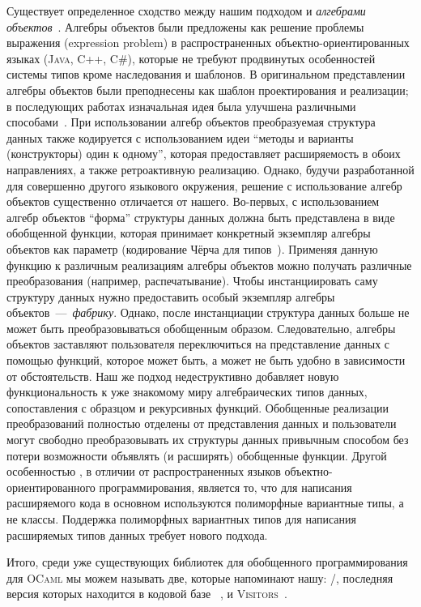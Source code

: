 Существует определенное сходство между нашим подходом и \emph{алгебрами объектов}~\cite{ObjectAlgebras}. Алгебры объектов были предложены как решение проблемы выражения (expression problem) в распространенных объектно-ориентированных языках  (\textsc{Java}, \textsc{C++}, \textsc{C\#}), которые не требуют продвинутых особенностей системы типов кроме наследования и шаблонов. В оригинальном представлении алгебры объектов были преподнесены как шаблон проектирования и реализации; в последующих работах изначальная идея была улучшена различными способами~\cite{ObjectAlgebrasAttribute,ObjectAlgebrasSYB}. При использовании алгебр объектов преобразуемая структура данных также кодируется с использованием идеи ``методы и варианты (конструкторы) один к одному'', которая предоставляет расширяемость в обоих направлениях, а также ретроактивную реализацию. Однако, будучи  разработанной для совершенно другого языкового окружения, решение с использование алгебр объектов существенно отличается от нашего. Во-первых, с использованием алгебр объектов ``форма'' структуры данных должна быть представлена в виде обобщенной функции, которая принимает конкретный экземпляр алгебры объектов как параметр (кодирование Чёрча для типов~\cite{Hinze}). Применяя данную функцию к различным реализациям алгебры объектов можно получать различные преобразования (например, распечатывание). Чтобы инстанциировать саму структуру данных нужно предоставить особый экземпляр алгебры объектов~---~\emph{фабрику}. Однако, после инстанциации структура данных больше не может быть преобразовываться обобщенным образом. Следовательно, алгебры объектов заставляют пользователя переключиться на представление данных с помощью функций, которое может быть, а может не быть удобно в зависимости от обстоятельств.  Наш же подход недеструктивно добавляет новую функциональность к уже знакомому миру алгебраических типов данных, сопоставления с образцом и рекурсивных функций. Обобщенные реализации преобразований полностью отделены от представления данных и пользователи могут свободно преобразовывать их структуры данных привычным способом  без потери возможности объявлять (и расширять) обобщенные функции. Другой особенностью \ocaml, в отличии от распространенных языков объектно-ориентированного программирования, является то, что для написания расширяемого кода в основном используются полиморфные вариантные типы, а не классы. Поддержка полиморфных вариантных типов для написания расширяемых типов данных требует нового подхода.


Итого, среди уже существующих библиотек для обобщенного программирования для \textsc{OCaml} мы можем называть две, которые напоминают нашу: /, последняя версия которых находится в кодовой базе ~\cite{PPXLib}, и \textsc{Visitors}~\cite{Visitors}.

